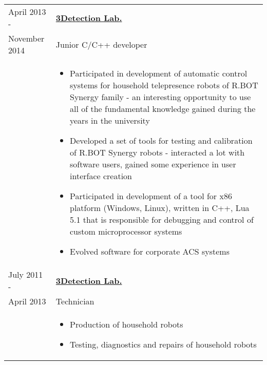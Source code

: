 \documentclass[a4paper, 11pt]{article}
\begin{document}
\begin{longtable}{p{25mm}|p{110mm}}
    \pagebreak[4]
    April 2013 -        & \textbf{\href{http://www.3detection.ru/}{3Detection Lab.}}\\
    November 2014       & Junior C/C++ developer                                    \\
                        &
    \begin{itemize}
        \item   Participated in development of automatic control systems for
                household telepresence robots of R.BOT Synergy family - an
                interesting opportunity to use all of the fundamental knowledge
                gained during the years in the university
        \item   Developed a set of tools for testing and calibration of
                R.BOT Synergy robots - interacted a lot with
                software users, gained some experience in user interface creation
        \item   Participated in development of a tool for x86 platform (Windows,
                Linux), written in C++, Lua 5.1 that is responsible for debugging
                and control of custom microprocessor systems
        \item   Evolved software for corporate ACS systems
    \end{itemize}                                                                   \\

    \pagebreak[3]
    July 2011 - & \textbf{\href{http://www.3detection.ru/}{3Detection Lab.}}        \\
    April 2013  & Technician                                                        \\
                &
    \begin{itemize}
        \item   Production of household robots
        \item   Testing, diagnostics and repairs of household robots
    \end{itemize}                                                                   \\
\end{longtable}
\end{document}
